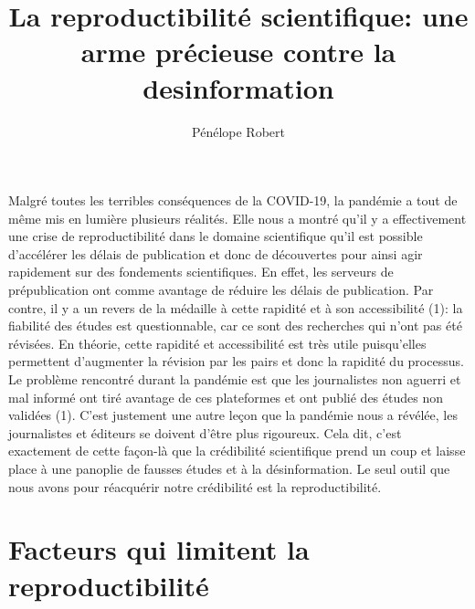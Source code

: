 \documentclass[9pt,twocolumn,twoside,]{pnas-new}
\title{La reproductibilité scientifique: une arme précieuse contre la
desinformation}
\author[a]{Pénélope Robert}
\affil[a]{Université de Sherbrooke, Départment de biologie, 2500
Boulevard de l'Université, Sherbrooke, Québec, G1V 0A9}
\begin{document}
\verticaladjustment{-2pt}



\maketitle
\thispagestyle{firststyle}


\acknow{}

Malgré toutes les terribles conséquences de la COVID-19, la pandémie a
tout de même mis en lumière plusieurs réalités. Elle nous a montré qu'il
y a effectivement une crise de reproductibilité dans le domaine
scientifique qu'il est possible d'accélérer les délais de publication et
donc de découvertes pour ainsi agir rapidement sur des fondements
scientifiques. En effet, les serveurs de prépublication ont comme
avantage de réduire les délais de publication. Par contre, il y a un
revers de la médaille à cette rapidité et à son accessibilité (1): la
fiabilité des études est questionnable, car ce sont des recherches qui
n'ont pas été révisées. En théorie, cette rapidité et accessibilité est
très utile puisqu'elles permettent d'augmenter la révision par les pairs
et donc la rapidité du processus. Le problème rencontré durant la
pandémie est que les journalistes non aguerri et mal informé ont tiré
avantage de ces plateformes et ont publié des études non validées (1).
C'est justement une autre leçon que la pandémie nous a révélée, les
journalistes et éditeurs se doivent d'être plus rigoureux. Cela dit,
c'est exactement de cette façon-là que la crédibilité scientifique prend
un coup et laisse place à une panoplie de fausses études et à la
désinformation. Le seul outil que nous avons pour réacquérir notre
crédibilité est la reproductibilité.

\hypertarget{facteurs-qui-limitent-la-reproductibilituxe9}{%
\section{Facteurs qui limitent la
reproductibilité}\label{facteurs-qui-limitent-la-reproductibilituxe9}}
\end{document}

